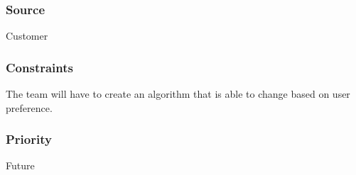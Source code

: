\subsubsection{Source}
Customer
\subsubsection{Constraints}
The team will have to create an algorithm that is able to change based on user preference.
\subsubsection{Priority}
Future
